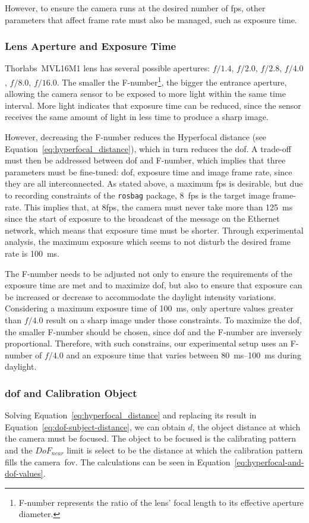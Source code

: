 However, to ensure the camera runs at the desired number of \ac{fps}, other parameters that affect frame rate must also be managed, such as exposure time.


\subsubsection{Lens Aperture and Exposure Time}
Thorlabs\cp~MVL16M1 lens has several possible apertures: $f/1.4$, $f/2.0$, $f/2.8$, $f/4.0$, $f/8.0$, $f/16.0$. The smaller the F-number\footnote{F-number represents the ratio of the lens' focal length to its effective aperture diameter.}, the bigger the entrance aperture, allowing the camera sensor to be exposed to more light within the same time interval. More light indicates that exposure time can be reduced, since the sensor receives the same amount of light in less time to produce a sharp image.

However, decreasing the F-number reduces the Hyperfocal distance (see Equation~\eqref{eq:hyperfocal_distance}), which in turn reduces the \acf{dof}. A trade-off must then be addressed between \ac{dof} and F-number, which implies that three parameters must be fine-tuned: \ac{dof}, exposure time and image frame rate, since they are all interconnected. As stated above, a maximum \ac{fps} is desirable, but due to recording constraints of the \texttt{rosbag} package, $8$~\ac{fps} is the target image frame-rate. This implies that, at $8$\ac{fps}, the camera must never take more than \SI{125}{\milli\second} since the start of exposure to the broadcast of the message on the Ethernet network, which means that exposure time must be shorter. Through experimental analysis, the maximum exposure which seems to not disturb the desired frame rate is \SI{100}{\milli\second}. 

The F-number needs to be adjusted not only to ensure the requirements of the exposure time are met and to maximize \acl{dof}, but also to ensure that exposure can be increased or decrease to accommodate the daylight intensity variations. Considering a maximum exposure time of \SI{100}{\milli\second}, only aperture values greater than $f/4.0$ result on a sharp image under those constraints. To maximize the \ac{dof}, the smaller F-number should be chosen, since \ac{dof} and the F-number are inversely proportional. Therefore, with such constrains, our experimental setup uses an F-number of $f/4.0$ and an exposure time that varies between \SIrange{80}{100}{\milli\second} during daylight.

\subsubsection{\acl{dof} and Calibration Object}
\label{subsec:calibration:dof-and-calibration-object}
Solving Equation~\eqref{eq:hyperfocal_distance} and replacing its result in Equation~\eqref{eq:dof-subject-distance}, we can obtain $d$, the object distance at which the camera must be focused. The object to be focused is the calibrating pattern and the $DoF_{near}$ limit is select to be the distance at which the calibration pattern fills the camera~\ac{fov}. The calculations can be seen in Equation~\eqref{eq:hyperfocal-and-dof-values}.

